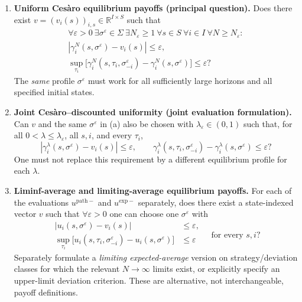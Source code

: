 \documentclass[11pt,a4paper]{article}
\newcommand{\R}{\mathbb R}
\begin{document}
\begin{enumerate}[label=\textbf{(\alph*)},leftmargin=2.5em]
	\item \textbf{Uniform Ces\`aro equilibrium payoffs (principal question).}
	Does there exist $v=(v_i(s))_{i,s}\in\R^{I\times S}$ such that
	\[
	\begin{gathered}
		\forall\varepsilon>0\ \exists\sigma^\varepsilon\in\Sigma\ 
		\exists N_\varepsilon\ge1\ \forall s\in S\ \forall i\in I\ 
		\forall N\ge N_\varepsilon:\\[-2pt]
		\left|\gamma_i^N(s,\sigma^\varepsilon)-v_i(s)\right|\le\varepsilon,\\
		\sup_{\tau_i}\bigl[\gamma_i^N(s,\tau_i,\sigma_{-i}^\varepsilon)
		-\gamma_i^N(s,\sigma^\varepsilon)\bigr]
		\le\varepsilon?
	\end{gathered}
	\]
	The \emph{same} profile $\sigma^\varepsilon$ must work for all
	sufficiently large horizons and all specified initial states.
	
	\item \textbf{Joint Ces\`aro--discounted uniformity (joint evaluation formulation).}
	Can $v$ and the same $\sigma^\varepsilon$ in (a) also be chosen
	with $\lambda_\varepsilon\in(0,1)$ such that, for all
	$0<\lambda\le\lambda_\varepsilon$, all $s,i$, and every $\tau_i$,
	\[
	\left|\gamma_i^\lambda(s,\sigma^\varepsilon)-v_i(s)\right|
	\le\varepsilon,\qquad
	\gamma_i^\lambda(s,\tau_i,\sigma_{-i}^\varepsilon)
	-\gamma_i^\lambda(s,\sigma^\varepsilon)\le\varepsilon?
	\]
	One must not replace this requirement by a different equilibrium
	profile for each $\lambda$.
	
	\item \textbf{Liminf-average and limiting-average equilibrium payoffs.}
	For each of the evaluations $u^{\mathrm{path}-}$ and
	$u^{\mathrm{exp}-}$ separately, does there exist a state-indexed vector
	$v$ such that $\forall\varepsilon>0$ one can choose one
	$\sigma^\varepsilon$ with
	\[
	\begin{aligned}
		\left|u_i(s,\sigma^\varepsilon)-v_i(s)\right|&\le\varepsilon,\\
		\sup_{\tau_i}\bigl[u_i(s,\tau_i,\sigma_{-i}^\varepsilon)
		-u_i(s,\sigma^\varepsilon)\bigr]
		&\le\varepsilon
	\end{aligned}
	\quad\text{for every }s,i?
	\]
	Separately formulate a \emph{limiting expected-average} version on
	strategy/deviation classes for which the relevant $N\to\infty$ limits
	exist, or explicitly specify an upper-limit deviation criterion.
	These are alternative, not interchangeable, payoff definitions.
	

\end{enumerate}
\end{document}
